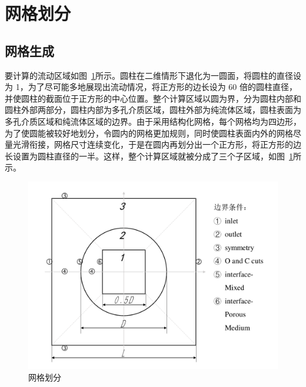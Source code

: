 



\section{网格划分}\label{sec: grid}

\subsection{网格生成}

要计算的流动区域如图~\ref{fig: grid}所示。圆柱在二维情形下退化为一圆面，将圆柱的直径设为 1，为了尽可能多地展现出流动情况，将正方形的边长设为 60 倍的圆柱直径，并使圆柱的截面位于正方形的中心位置。整个计算区域以圆为界，分为圆柱内部和圆柱外部两部分，圆柱内部为多孔介质区域，圆柱外部为纯流体区域，圆柱表面为多孔介质区域和纯流体区域的边界。由于采用结构化网格，每个网格均为四边形，为了使圆能被较好地划分，令圆内的网格更加规则，同时使圆柱表面内外的网格尽量光滑衔接，网格尺寸连续变化，于是在圆内再划分出一个正方形，将正方形的边长设置为圆柱直径的一半。这样，整个计算区域就被分成了三个子区域，如图~\ref{fig: grid}所示。

\begin{figure}
	\centering
	\includegraphics[scale=.6]{figs/grid}
	\caption{网格划分}\label{fig: grid}
\end{figure}

